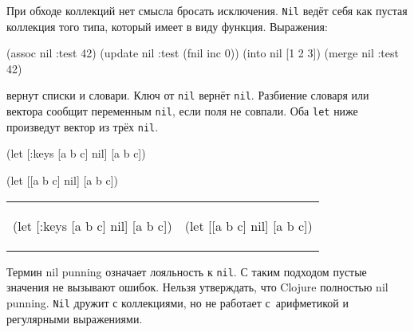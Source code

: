 При обходе коллекций нет смысла бросать исключения. \verb|Nil| ведёт себя как
пустая коллекция того типа, который имеет в виду функция. Выражения:

\begin{english}
  \begin{clojure}
(assoc nil :test 42)
(update nil :test (fnil inc 0))
(into nil [1 2 3])
(merge nil {:test 42})
  \end{clojure}
\end{english}

\noindent
вернут списки и словари. Ключ от \verb|nil| вернёт \verb|nil|. Разбиение словаря
или вектора сообщит переменным \verb|nil|, если поля не совпали. Оба \verb|let|
ниже произведут вектор из трёх \verb|nil|.

\ifnarrow

\begin{english}
  \begin{clojure}
(let [{:keys [a b c]} nil]
  [a b c])
  \end{clojure}

\splitter

  \begin{clojure}
(let [[a b c] nil]
  [a b c])
  \end{clojure}
\end{english}

\else

\begin{english}
\noindent
\begin{tabular}{ @{}p{5.5cm} @{}p{4cm} }

  \begin{clojure}
(let [{:keys [a b c]} nil]
  [a b c])
  \end{clojure}

&

  \begin{clojure}
(let [[a b c] nil]
  [a b c])
  \end{clojure}

\end{tabular}

\end{english}

\fi


Термин nil punning означает лояльность к \verb|nil|. С таким подходом
пустые значения не вызывают ошибок. Нельзя утверждать, что Clojure полностью
nil punning. \verb|Nil| дружит с коллекциями, но не работает с~арифметикой
и регулярными выражениями.

